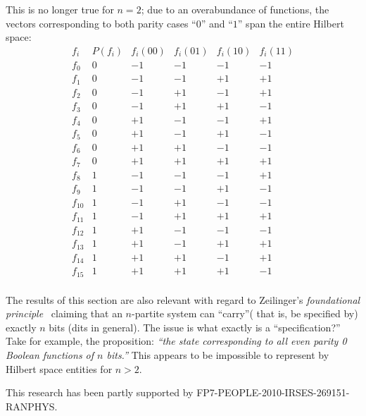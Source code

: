 \documentclass[%
 12pt,
 reprint,
  twocolumn,
 showpacs,
 showkeys,
 preprintnumbers,
 amsmath,amssymb,
 aps,
  pra,
  longbibliography,
 ]{revtex4-1}
\begin{document}
This is no longer true for $n=2$; due to an overabundance of functions,
the vectors corresponding to both parity cases ``$0$'' and ``$1$'' span the entire Hilbert space:
\begin{equation}
\begin{array}{c|ccccc}
f_i&P(f_i)&f_i(00)&f_i(01)&f_i(10)&f_i(11)\\
\hline
f_0& 0 & -1 & -1 & -1 & -1 \\
f_1& 0 & -1 & -1 & +1 & +1 \\
f_2& 0 & -1 & +1 & -1 & +1 \\
f_3& 0 & -1 & +1 & +1 & -1 \\
f_4& 0 & +1 & -1 & -1 & +1 \\
f_5& 0 & +1 & -1 & +1 & -1 \\
f_6& 0 & +1 & +1 & -1 & -1 \\
f_7& 0 & +1 & +1 & +1 & +1 \\
f_8& 1 & -1 & -1 & -1 & +1 \\
f_9& 1 & -1 & -1 & +1 & -1 \\
f_{10}& 1 & -1 & +1 & -1 & -1 \\
f_{11}& 1 & -1 & +1 & +1 & +1 \\
f_{12}& 1 & +1 & -1 & -1 & -1 \\
f_{13}& 1 & +1 & -1 & +1 & +1 \\
f_{14}& 1 & +1 & +1 & -1 & +1 \\
f_{15}& 1 & +1 & +1 & +1 & -1  \\
\end{array}
\end{equation}





The results of this section are also relevant with regard to Zeilinger's {\em foundational principle}~\cite{Zeilinger-97,zeil-99}
claiming that an $n$-partite system can ``carry''( that is, be specified by) exactly $n$ bits (dits in general).
The issue is what exactly is a ``specification?'' Take for example, the proposition:
{\em ``the state corresponding to all even parity 0 Boolean functions of $n$ bits.''}
This appears to be impossible to represent by Hilbert space entities for $n>2$.



\begin{acknowledgments}
This research has been partly supported by FP7-PEOPLE-2010-IRSES-269151-RANPHYS.
\end{acknowledgments}

\clearpage

\end{document}
